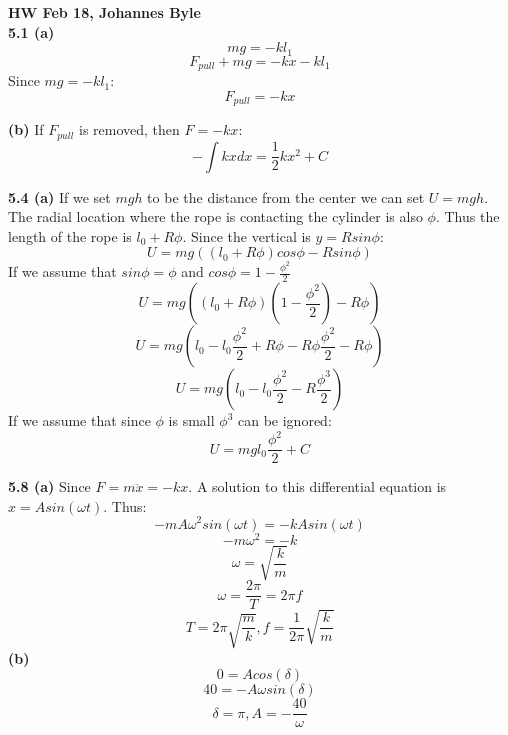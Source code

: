 \documentclass[english]{article}
\begin{document}
\textbf{HW Feb 18, Johannes Byle}\\

\noindent
\textbf{5.1 (a)} $$mg=-kl_1$$
$$F_{pull}+mg=-kx-kl_1$$
Since $mg=-kl_1$:
$$F_{pull}=-kx$$

\noindent
\textbf{(b)} If $F_{pull}$ is removed, then $F=-kx$:
$$-\int kxdx=\frac{1}{2}kx^2+C$$

\noindent
\textbf{5.4 (a)} If we set $mgh$ to be the distance from the center we can set $U=mgh$. The radial location where the rope is contacting the cylinder is also $\phi$. Thus the length of the rope is $l_0+R\phi$. Since the vertical is $y=Rsin\phi$:
$$U=mg((l_0+R\phi)cos\phi-Rsin\phi)$$ 
If we assume that $sin\phi=\phi$ and $cos\phi=1-\frac{\phi^2}{2}$
$$U=mg((l_0+R\phi)(1-\frac{\phi^2}{2})-R\phi)$$
$$U=mg(l_0-l_0\frac{\phi^2}{2}+R\phi-R\phi\frac{\phi^2}{2}-R\phi)$$
$$U=mg(l_0-l_0\frac{\phi^2}{2}-R\frac{\phi^3}{2})$$
If we assume that since $\phi$ is small $\phi^3$ can be ignored:
$$U=mgl_0\frac{\phi^2}{2}+C$$

\noindent
\textbf{5.8 (a)} Since $F=m\ddot{x}=-kx$. A solution to this differential equation is $x=Asin(\omega t)$. Thus:
$$-mA\omega^2sin(\omega t)=-kAsin(\omega t)$$
$$-m\omega^2=-k$$
$$\omega=\sqrt{\frac{k}{m}}$$
$$\omega=\frac{2\pi}{T}=2\pi f$$
$$T=2\pi\sqrt{\frac{m}{k}},f=\frac{1}{2\pi}\sqrt{\frac{k}{m}}$$
\noindent
\textbf{(b)} $$0=Acos(\delta)$$
$$40=-A\omega sin(\delta)$$
$$\delta=\pi,A=-\frac{40}{\omega}$$
\end{document}
